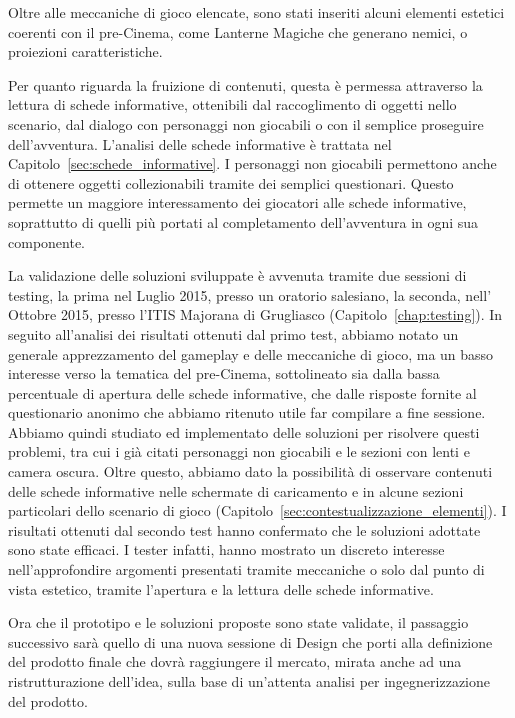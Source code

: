 Oltre alle meccaniche di gioco elencate, sono stati inseriti alcuni elementi estetici coerenti con il pre-Cinema, come Lanterne Magiche che generano nemici, o proiezioni caratteristiche.

Per quanto riguarda la fruizione di contenuti, questa è permessa attraverso la lettura di schede informative, ottenibili dal raccoglimento di oggetti nello scenario, dal dialogo con personaggi non giocabili o con il semplice proseguire dell’avventura. L'analisi delle schede informative è trattata nel Capitolo~\ref{sec:schede_informative}.
I personaggi non giocabili permettono anche di ottenere oggetti collezionabili tramite dei semplici questionari. Questo permette un maggiore interessamento dei giocatori alle schede informative, soprattutto di quelli più portati al completamento dell’avventura in ogni sua componente.

La validazione delle soluzioni sviluppate è avvenuta tramite due sessioni di testing, la prima nel Luglio 2015, presso un oratorio salesiano, la seconda, nell' Ottobre 2015, presso l’ITIS Majorana di Grugliasco (Capitolo~\ref{chap:testing}).
In seguito all’analisi dei risultati ottenuti dal primo test, abbiamo notato un generale apprezzamento del gameplay e delle meccaniche di gioco, ma un basso interesse verso la tematica del pre-Cinema, sottolineato sia dalla bassa percentuale di apertura delle schede informative, che dalle risposte fornite al questionario anonimo che abbiamo ritenuto utile far compilare a fine sessione.
Abbiamo quindi studiato ed implementato delle soluzioni per risolvere questi problemi, tra cui i già citati personaggi non giocabili e le sezioni con lenti e camera oscura. Oltre questo, abbiamo dato la possibilità di osservare contenuti delle schede informative nelle schermate di caricamento e in alcune sezioni particolari dello scenario di gioco (Capitolo~\ref{sec:contestualizzazione_elementi}).
I risultati ottenuti dal secondo test hanno confermato che le soluzioni adottate sono state efficaci. I tester infatti, hanno mostrato un discreto interesse nell’approfondire argomenti presentati tramite meccaniche o solo dal punto di vista estetico, tramite l’apertura e la lettura delle schede informative.

Ora che il prototipo e le soluzioni proposte sono state validate, il passaggio successivo sarà quello di una nuova sessione di Design che porti alla definizione del prodotto finale che dovrà raggiungere il mercato, mirata anche ad una ristrutturazione dell’idea, sulla base di un’attenta analisi per ingegnerizzazione del prodotto.

